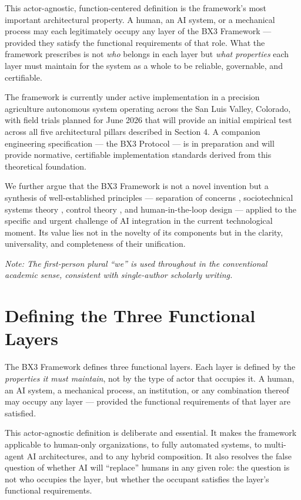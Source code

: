 \documentclass[12pt]{article}
\begin{document}
This actor-agnostic, function-centered definition is the framework's most important architectural property. A human, an AI system, or a mechanical process may each legitimately occupy any layer of the BX3 Framework --- provided they satisfy the functional requirements of that role. What the framework prescribes is not \textit{who} belongs in each layer but \textit{what properties} each layer must maintain for the system as a whole to be reliable, governable, and certifiable.

The framework is currently under active implementation in a precision agriculture autonomous system operating across the San Luis Valley, Colorado, with field trials planned for June 2026 that will provide an initial empirical test across all five architectural pillars described in Section 4. A companion engineering specification --- the BX3 Protocol --- is in preparation and will provide normative, certifiable implementation standards derived from this theoretical foundation.

We further argue that the BX3 Framework is not a novel invention but a synthesis of well-established principles --- separation of concerns \cite{dijkstra1982}, sociotechnical systems theory \cite{trist1981}, control theory \cite{wiener1948}, and human-in-the-loop design \cite{bansal2019} --- applied to the specific and urgent challenge of AI integration in the current technological moment. Its value lies not in the novelty of its components but in the clarity, universality, and completeness of their unification.

\textit{Note: The first-person plural ``we'' is used throughout in the conventional academic sense, consistent with single-author scholarly writing.}

\section{Defining the Three Functional Layers}
\label{sec:layers}

The BX3 Framework defines three functional layers. Each layer is defined by the \textit{properties it must maintain}, not by the type of actor that occupies it. A human, an AI system, a mechanical process, an institution, or any combination thereof may occupy any layer --- provided the functional requirements of that layer are satisfied.

This actor-agnostic definition is deliberate and essential. It makes the framework applicable to human-only organizations, to fully automated systems, to multi-agent AI architectures, and to any hybrid composition. It also resolves the false question of whether AI will ``replace'' humans in any given role: the question is not who occupies the layer, but whether the occupant satisfies the layer's functional requirements.
\end{document}
